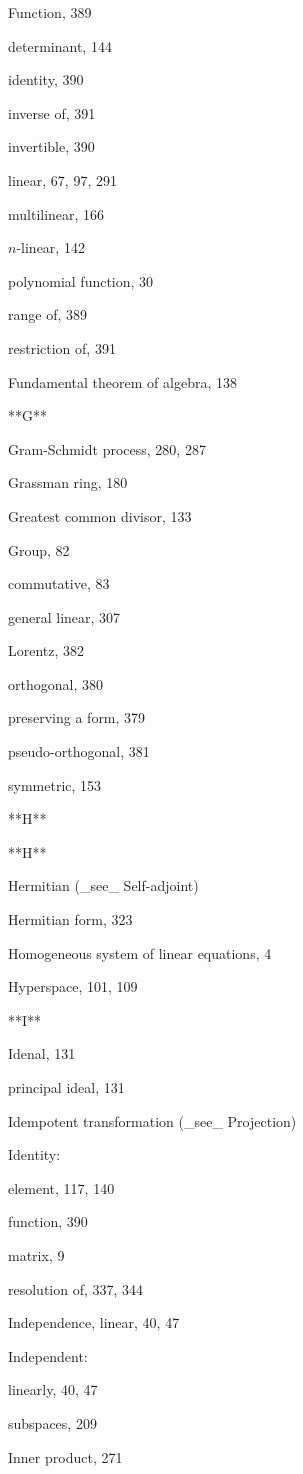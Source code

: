 Function, 389

determinant, 144

identity, 390

inverse of, 391

invertible, 390

linear, 67, 97, 291

multilinear, 166

\(n\)-linear, 142

polynomial function, 30

range of, 389

restriction of, 391

Fundamental theorem of algebra, 138

**G**

Gram-Schmidt process, 280, 287

Grassman ring, 180

Greatest common divisor, 133

Group, 82

commutative, 83

general linear, 307

Lorentz, 382

orthogonal, 380

preserving a form, 379

pseudo-orthogonal, 381

symmetric, 153

**H**

**H**

Hermitian (_see_ Self-adjoint)

Hermitian form, 323

Homogeneous system of linear equations, 4

Hyperspace, 101, 109

**I**

Idenal, 131

principal ideal, 131

Idempotent transformation (_see_ Projection)

Identity:

element, 117, 140

function, 390

matrix, 9

resolution of, 337, 344

Independence, linear, 40, 47

Independent:

linearly, 40, 47

subspaces, 209

Inner product, 271

